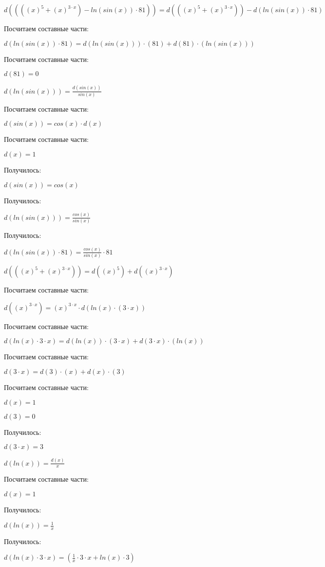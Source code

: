 $ d((((x)^{5}+(x)^{3 \cdot x})-ln(sin(x)) \cdot 81)) = d(((x)^{5}+(x)^{3 \cdot x})) - d(ln(sin(x)) \cdot 81)$

Посчитаем составные части:

$ d(ln(sin(x)) \cdot 81) = d(ln(sin(x))) \cdot (81) + d(81) \cdot (ln(sin(x)))$

Посчитаем составные части:

$ d(81) = 0$

$ d(ln(sin(x))) = \frac{d(sin(x))}{sin(x)}$

Посчитаем составные части:

$ d(sin(x)) = cos(x) \cdot d(x)$

Посчитаем составные части:

$ d(x) = 1$

Получилось:

$ d(sin(x)) = cos(x)$

Получилось:

$ d(ln(sin(x))) = \frac{cos(x)}{sin(x)}$

Получилось:

$ d(ln(sin(x)) \cdot 81) = \frac{cos(x)}{sin(x)} \cdot 81$

$ d(((x)^{5}+(x)^{3 \cdot x})) = d((x)^{5}) + d((x)^{3 \cdot x})$

Посчитаем составные части:

$ d((x)^{3 \cdot x}) = (x)^{3 \cdot x} \cdot d(ln(x) \cdot (3 \cdot x))$

Посчитаем составные части:

$ d(ln(x) \cdot 3 \cdot x) = d(ln(x)) \cdot (3 \cdot x) + d(3 \cdot x) \cdot (ln(x))$

Посчитаем составные части:

$ d(3 \cdot x) = d(3) \cdot (x) + d(x) \cdot (3)$

Посчитаем составные части:

$ d(x) = 1$

$ d(3) = 0$

Получилось:

$ d(3 \cdot x) = 3$

$ d(ln(x)) = \frac{d(x)}{x}$

Посчитаем составные части:

$ d(x) = 1$

Получилось:

$ d(ln(x)) = \frac{1}{x}$

Получилось:

$ d(ln(x) \cdot 3 \cdot x) = (\frac{1}{x} \cdot 3 \cdot x+ln(x) \cdot 3)$

